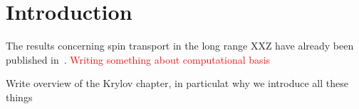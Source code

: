 \chapter{Introduction}
\thispagestyle{chapterBeginStyle}

The results concerning spin transport in the long range XXZ have already been published in~\textcite{Mierzejewski2023}.
\textcolor{red}{Writing something about computational basis}

Write overview of the Krylov chapter, in particulat why we introduce all these things